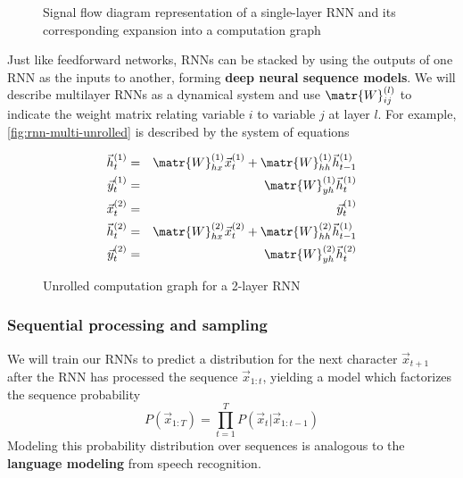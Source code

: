 \begin{figure}[htpb]
    \centering
    
    \caption{Signal flow diagram representation of a single-layer RNN and its corresponding
    expansion into a computation graph}
    \label{fig:rnn-single-unrolled}
\end{figure}

Just like feedforward networks, RNNs can be stacked by using the outputs of one
RNN as the inputs to another, forming \textbf{deep neural sequence models}. We
will describe multilayer RNNs as a dynamical system and use
$\matr{W}^{(l)}_{ij}$ to indicate the weight matrix relating variable $i$ to
variable $j$ at layer $l$. For example, \autoref{fig:rnn-multi-unrolled} is described
by the system of equations

\begin{eqnarray}
    \vec{h}^{(1)}_t &=& \matr{W}^{(1)}_{hx} \vec{x}^{(1)}_t + \matr{W}^{(1)}_{hh} \vec{h}^{(1)}_{t-1} \\
    \vec{y}^{(1)}_t &=& \matr{W}^{(1)}_{yh} \vec{h}^{(1)}_t \\
    \vec{x}^{(2)}_t &=& \vec{y}^{(1)}_t \\
    \vec{h}^{(2)}_t &=& \matr{W}^{(2)}_{hx} \vec{x}^{(2)}_t + \matr{W}^{(2)}_{hh} \vec{h}^{(1)}_{t-1} \\
    \vec{y}^{(2)}_t &=& \matr{W}^{(2)}_{yh} \vec{h}^{(2)}_t \\
\end{eqnarray}

\begin{figure}[htpb]
    \centering
    
    \caption{Unrolled computation graph for a 2-layer RNN}
    \label{fig:rnn-multi-unrolled}
\end{figure}

\subsubsection{Sequential processing and sampling}

We will train our RNNs to predict a distribution for the next character
$\vec{x}_{t+1}$ after the RNN has processed the sequence $\vec{x}_{1:t}$,
yielding a model which factorizes the sequence probability
\begin{equation}
    P(\vec{x}_{1:T}) = \prod_{t=1}^T P(\vec{x}_t | \vec{x}_{1:t-1} )
\end{equation}
Modeling this probability distribution over sequences is analogous to the
\textbf{language modeling} from speech recognition.

